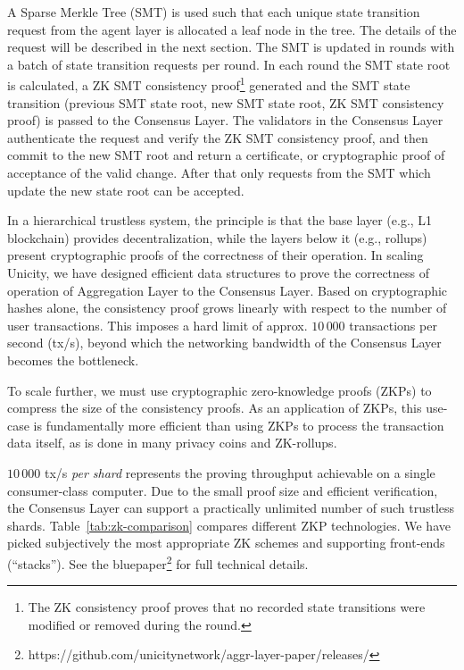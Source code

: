 \documentclass{article}
\begin{document}
A Sparse Merkle Tree (SMT) is used such that each unique state transition request from the agent layer is allocated a leaf node in the tree. The details of the request will be described in the next section. The SMT is updated in rounds with a batch of state transition requests per round. In each round the SMT state root is calculated, a ZK SMT consistency proof\footnote{The ZK consistency proof proves that no recorded state transitions were modified or removed during the round.} generated and the SMT state transition (previous SMT state root, new SMT state root, ZK SMT consistency proof) is passed to the Consensus Layer. The validators in the Consensus Layer authenticate the request and verify the ZK SMT consistency proof, and then commit to the new SMT root and return a certificate, or cryptographic proof of acceptance of the valid change. After that only requests from the SMT which update the new state root can be accepted.

In a hierarchical trustless system, the principle is that the base layer (e.g., L1 blockchain) provides decentralization, while the layers below it (e.g., rollups) present cryptographic proofs of the correctness of their operation. In scaling Unicity, we have designed efficient data structures to prove the correctness of operation of Aggregation Layer to the Consensus Layer. Based on cryptographic hashes alone, the consistency proof grows linearly with respect to the number of user transactions. This imposes a hard limit of approx. $10\,000$ transactions per second (tx/s), beyond which the networking bandwidth of the Consensus Layer becomes the bottleneck.

To scale further, we must use cryptographic zero-knowledge proofs (ZKPs) to compress the size of the consistency proofs. As an application of ZKPs, this use-case is fundamentally more efficient than using ZKPs to process the transaction data itself, as is done in many privacy coins and ZK-rollups.

$10\,000$ tx/s \emph{per shard} represents the proving throughput achievable on a single consumer-class computer. Due to the small proof size and efficient verification, the Consensus Layer can support a practically unlimited number of such trustless shards. Table~\ref{tab:zk-comparison} compares different ZKP technologies. We have picked subjectively the most appropriate ZK schemes and supporting front-ends (``stacks''). See the bluepaper\footnote{https://github.com/unicitynetwork/aggr-layer-paper/releases/} for full technical details.
\end{document}

